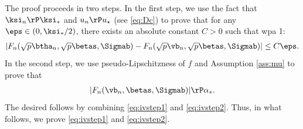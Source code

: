 The proof proceeds in two steps. In the first step, we use the fact that $\ksi_n\rP\ksi_*$ and $u_n\rP u_\star$ (see \eqref{eq:Dc}) to prove that for any $\eps\in(0,\ksi_*/2)$, there exists an absolute constant $C>0$ such that wpa 1:
\begin{align}\label{eq:ivstep1}
|F_n(\sqrt{p}\btha_n,\sqrt{p}\betas,\Sigmab) - F_n(\sqrt{p}\vb_n,\sqrt{p}\betas,\Sigmab) | \leq C\eps.
\end{align}
In the second step, we use pseudo-Lipschitzness of $f$ and Assumption \ref{ass:mu} to prove that
\begin{align}
|F_n(\vb_n,\betas,\Sigmab)| \rP \alpha_*.\label{eq:ivstep2}
\end{align}
The desired follows by combining \eqref{eq:ivstep1} and \eqref{eq:ivstep2}. Thus, in what follows, we prove \eqref{eq:ivstep1} and \eqref{eq:ivstep2}.


